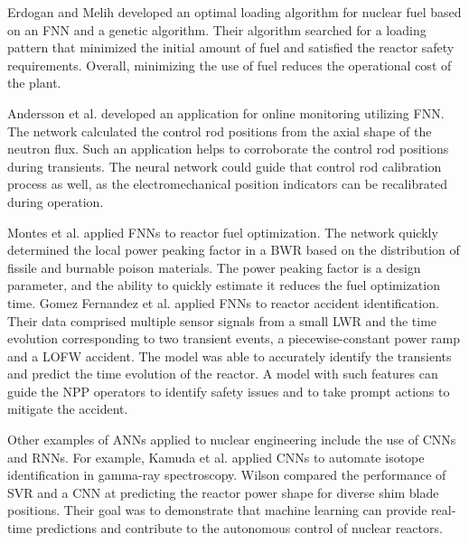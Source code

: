 Erdogan and Melih \cite{erdogan_pwr_2003} developed an optimal loading algorithm for nuclear fuel based on an \gls*{FNN} and a genetic algorithm.
Their algorithm searched for a loading pattern that minimized the initial amount of fuel and satisfied the reactor safety requirements.
Overall, minimizing the use of fuel reduces the operational cost of the plant.

Andersson et al. \cite{andersson_development_2003} developed an application for online monitoring utilizing \gls*{FNN}.
The network calculated the control rod positions from the axial shape of the neutron flux.
Such an application helps to corroborate the control rod positions during transients.
The neural network could guide that control rod calibration process as well, as the electromechanical position indicators can be recalibrated during operation.

Montes et al. \cite{montes_local_2009} applied FNNs to reactor fuel optimization.
The network quickly determined the local power peaking factor in a \gls*{BWR} based on the distribution of fissile and burnable poison materials.
The power peaking factor is a design parameter, and the ability to quickly estimate it reduces the fuel optimization time.
Gomez Fernandez et al. \cite{gomez_fernandez_nuclear_2017} applied FNNs to reactor accident identification.
Their data comprised multiple sensor signals from a small \gls*{LWR} and the time evolution corresponding to two transient events, a piecewise-constant power ramp and a \gls*{LOFW} accident.
The model was able to accurately identify the transients and predict the time evolution of the reactor.
A model with such features can guide the \gls*{NPP} operators to identify safety issues and to take prompt actions to mitigate the accident.

Other examples of \glspl*{ANN} applied to nuclear engineering include the use of \glspl*{CNN} and \glspl*{RNN}.
For example, Kamuda et al. \cite{kamuda_comparison_2018} applied \glspl*{CNN} to automate isotope identification in gamma-ray spectroscopy.
Wilson \cite{wilson_machine_2019} compared the performance of \gls*{SVR} and a CNN at predicting the reactor power shape for diverse shim blade positions.
Their goal was to demonstrate that machine learning can provide real-time predictions and contribute to the autonomous control of nuclear reactors.

